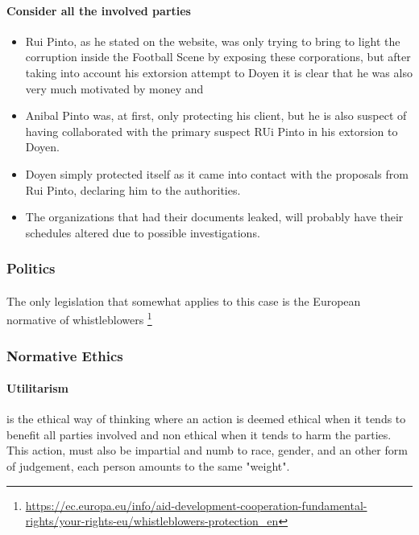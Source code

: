 \paragraph{Consider all the involved parties}
\begin{itemize}
    \item Rui Pinto, as he stated on the website, was only trying to bring to light the corruption inside the Football Scene by exposing these corporations, but after taking into account his extorsion attempt to Doyen it is clear that he was also very much motivated by money and 
    \item Anibal Pinto was, at first, only protecting his client, but he is also suspect of having collaborated with the primary suspect RUi Pinto in his extorsion to Doyen.
    \item Doyen simply protected itself as it came into contact with the proposals from Rui Pinto, declaring him to the authorities.
    \item The organizations that had their documents leaked, will probably have their schedules altered due to possible investigations.
\end{itemize}


\subsubsection{Politics}
\paragraph{}
The only legislation that somewhat applies to this case is the European normative of whistleblowers
\footnote{\url{https://ec.europa.eu/info/aid-development-cooperation-fundamental-rights/your-rights-eu/whistleblowers-protection_en}}


\subsubsection{Normative Ethics}

\paragraph{Utilitarism}
    is the ethical way of thinking where an action is deemed ethical when it tends to benefit all parties involved and non ethical when it tends to harm the parties.
    This action, must also be impartial and numb to race, gender, and an other form of judgement, each person amounts to the same "weight".


